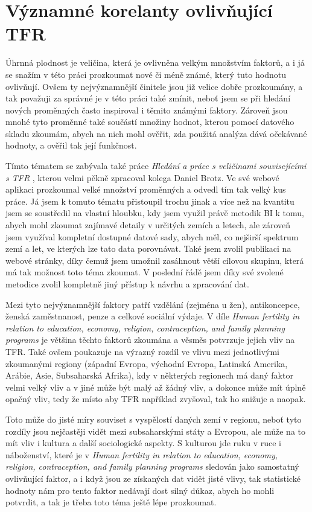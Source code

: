 \documentclass[thesis=M,czech]{FITthesis}[2022/10/08]
\begin{document}
\section{Významné korelanty ovlivňující TFR}
Úhrnná plodnost je veličina, která je ovlivněna velkým množstvím faktorů, a i já se snažím v této práci prozkoumat nové či méně známé, který tuto hodnotu ovlivňují. Ovšem ty nejvýznamnější činitele jsou již velice dobře prozkoumány, a tak považuji za správné je v této práci také zmínit, neboť jsem se při hledání nových proměnných často inspiroval i těmito známými faktory.
Zároveň jsou mnohé tyto proměnné také součástí množiny hodnot, kterou pomocí datového skladu zkoumám, abych na nich mohl ověřit, zda použitá analýza dává očekávané hodnoty, a ověřil tak její funkčnost. 

Tímto tématem se zabývala také práce \textit{Hledání a práce s veličinami souvisejícími s TFR} \cite{brotz}, kterou velmi pěkně zpracoval kolega Daniel Brotz. Ve své webové aplikaci prozkoumal velké množství proměnných a odvedl tím tak velký kus práce. Já jsem k tomuto tématu přistoupil trochu jinak a více než na kvantitu jsem se soustředil na vlastní hloubku, kdy jsem využil právě metodik BI k tomu, abych mohl zkoumat zajímavé detaily v určitých zemích a letech, ale zároveň jsem využíval kompletní dostupné datové sady, abych měl, co nejširší spektrum zemí a let, ve kterých lze tato data porovnávat. Také jsem zvolil publikaci na webové stránky, díky čemuž jsem umožnil zasáhnout větší cílovou skupinu, která má tak možnost toto téma zkoumat. V poslední řádě jsem díky své zvolené metodice zvolil kompletně jiný přístup k návrhu a zpracování dat.

Mezi tyto nejvýznamnější faktory patří vzdělání (zejména u žen), antikoncepce, ženská zaměstnanost, penze a celkové sociální výdaje.  
 V díle \textit{Human fertility in relation to education, economy, religion, contraception, and family planning programs}\cite{Götmark} je většina těchto faktorů zkoumána a věsměs potvrzuje jejich vliv na TFR. Také ovšem poukazuje na výrazný rozdíl ve vlivu mezi jednotlivými zkoumanými regiony (západní Evropa, východní Evropa, Latinská Amerika, Arábie, Asie, Subsaharská Afrika), kdy v některých regionech má daný faktor velmi velký vliv a v jiné může být malý až žádný vliv, a dokonce může mít úplně opačný vliv, tedy že místo aby TFR například zvyšoval, tak ho snižuje a naopak.

Toto může do jisté míry souviset s vyspělostí daných zemí v regionu, neboť tyto rozdíly jsou nejčastěji vidět mezi subsaharskými státy a Evropou, ale může na to mít vliv i kultura a další sociologické aspekty. S kulturou jde ruku v ruce i náboženství, které je v \textit{Human fertility in relation to education, economy, religion, contraception, and family planning programs}\cite{Götmark} sledován jako samostatný ovlivňující faktor, a i když jsou ze získaných dat vidět jisté vlivy, tak statistické hodnoty nám pro tento faktor nedávají dost silný důkaz, abych ho mohli potvrdit, a tak je třeba toto téma ještě lépe prozkoumat. 
\end{document}
